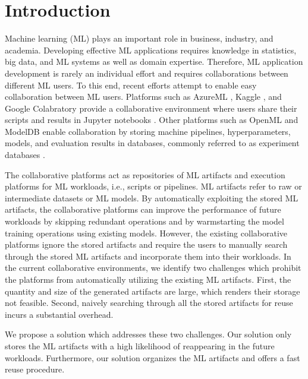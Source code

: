 \section{Introduction} \label{sec-introduction}
Machine learning (ML) plays an important role in business, industry, and academia. 
Developing effective ML applications requires knowledge in statistics, big data, and ML systems as well as domain expertise.
Therefore, ML application development is rarely an individual effort and requires collaborations between different ML users.
To this end, recent efforts attempt to enable easy collaboration between ML users.
Platforms such as AzureML \cite{team2016azureml}, Kaggle \cite{kagglewebsite}, and Google Colabratory \cite{googlecolab} provide a collaborative environment where users share their scripts and results in Jupyter notebooks \cite{Kluyver:2016aa}.
Other platforms such as OpenML \cite{vanschoren2014openml} and ModelDB \cite{vartak2016m} enable collaboration by storing machine pipelines, hyperparameters, models, and evaluation results in databases, commonly referred to as experiment databases \cite{Vanschoren2012}.

The collaborative platforms act as repositories of ML artifacts and execution platforms for ML workloads, i.e., scripts or pipelines.
ML artifacts refer to raw or intermediate datasets or ML models.
By automatically exploiting the stored ML artifacts, the collaborative platforms can improve the performance of future workloads by skipping redundant operations and by warmstarting the model training operations using existing models.
However, the existing collaborative platforms ignore the stored artifacts and require the users to manually search through the stored ML artifacts and incorporate them into their workloads.
In the current collaborative environments, we identify two challenges which prohibit the platforms from automatically utilizing the existing ML artifacts.
First, the quantity and size of the generated artifacts are large, which renders their storage not feasible.
Second, naively searching through all the stored artifacts for reuse incurs a substantial overhead.


We propose a solution which addresses these two challenges.
Our solution only stores the ML artifacts with a high likelihood of reappearing in the future workloads.
Furthermore, our solution organizes the ML artifacts and offers a fast reuse procedure.

